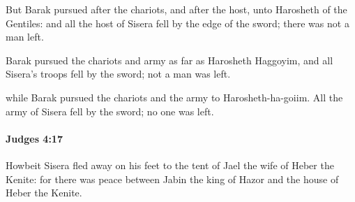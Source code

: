 			\begin{versebox}
					\item[BHS] 
					\item[ASV] But Barak pursued after the chariots, and after the host, unto Harosheth of the Gentiles: and all the host of Sisera fell by the edge of the sword; there was not a man left.
					\item[NIV] Barak pursued the chariots and army as far as Harosheth Haggoyim, and all Sisera’s troops fell by the sword; not a man was left.
					\item[NRSV] while Barak pursued the chariots and the army to Harosheth-ha-goiim. All the army of Sisera fell by the sword; no one was left.
			\end{versebox}

		\paragraph{Judges 4:17} %
			\label{JUDGES-4-17}

			Howbeit Sisera fled away on his feet to the tent of Jael the wife of Heber the Kenite: for there was peace between Jabin the king of Hazor and the house of Heber the Kenite.

